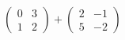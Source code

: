 \hspace*{2mm}\begin{minipage}[t]{\dimexpr\linewidth-2mm\relax}\vspace{0pt}
$\begin{pmatrix} 0 & 3 \\ 1 & 2 \end{pmatrix}+\begin{pmatrix} 2 & -1 \\ 5 & -2 \end{pmatrix}$\end{minipage}
